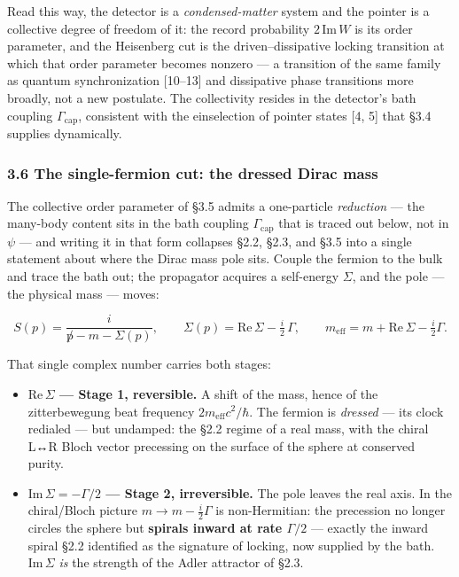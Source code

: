 \documentclass[
]{article}
\providecommand{\tightlist}{%
  \setlength{\itemsep}{0pt}\setlength{\parskip}{0pt}}
\begin{document}
Read this way, the detector is a \emph{condensed-matter} system and the
pointer is a collective degree of freedom of it: the record probability
\(2\,\mathrm{Im}\,W\) is its order parameter, and the Heisenberg cut is
the driven--dissipative locking transition at which that order parameter
becomes nonzero --- a transition of the same family as quantum
synchronization {[}10--13{]} and dissipative phase transitions more
broadly, not a new postulate. The collectivity resides in the detector's
bath coupling \(\Gamma_{\text{cap}}\), consistent with the einselection
of pointer states {[}4, 5{]} that §3.4 supplies dynamically.

\subsubsection{3.6 The single-fermion cut: the dressed Dirac
mass}\label{the-single-fermion-cut-the-dressed-dirac-mass}

The collective order parameter of §3.5 admits a one-particle
\emph{reduction} --- the many-body content sits in the bath coupling
\(\Gamma_{\text{cap}}\) that is traced out below, not in \(\psi\) ---
and writing it in that form collapses §2.2, §2.3, and §3.5 into a single
statement about where the Dirac mass pole sits. Couple the fermion to
the bulk and trace the bath out; the propagator acquires a self-energy
\(\Sigma\), and the pole --- the physical mass --- moves:

\[S(p) = \frac{i}{\not p - m - \Sigma(p)}, \qquad \Sigma(p) = \mathrm{Re}\,\Sigma - \tfrac{i}{2}\,\Gamma, \qquad m_{\text{eff}} = m + \mathrm{Re}\,\Sigma - \tfrac{i}{2}\Gamma.\]

That single complex number carries both stages:

\begin{itemize}
\tightlist
\item
  \textbf{\(\mathrm{Re}\,\Sigma\) --- Stage 1, reversible.} A shift of
  the mass, hence of the zitterbewegung beat frequency
  \(2m_{\text{eff}}c^2/\hbar\). The fermion is \emph{dressed} --- its
  clock redialed --- but undamped: the §2.2 regime of a real mass, with
  the chiral L↔R Bloch vector precessing on the surface of the sphere at
  conserved purity.
\item
  \textbf{\(\mathrm{Im}\,\Sigma = -\Gamma/2\) --- Stage 2,
  irreversible.} The pole leaves the real axis. In the chiral/Bloch
  picture \(m\to m-\tfrac{i}{2}\Gamma\) is non-Hermitian: the precession
  no longer circles the sphere but \textbf{spirals inward at rate
  \(\Gamma/2\)} --- exactly the inward spiral §2.2 identified as the
  signature of locking, now supplied by the bath.
  \(\mathrm{Im}\,\Sigma\) \emph{is} the strength of the Adler attractor
  of §2.3.
\end{itemize}
\end{document}
